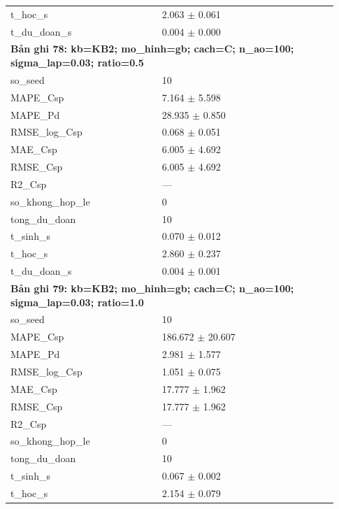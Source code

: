 \begin{longtable}{p{0.43\linewidth}p{0.50\linewidth}}
t\_\allowbreak hoc\_\allowbreak s & 2.063 $\pm$ 0.061 \\
t\_\allowbreak du\_\allowbreak doan\_\allowbreak s & 0.004 $\pm$ 0.000 \\
\midrule
\multicolumn{2}{p{0.95\linewidth}}{\textbf{Bản ghi 78: kb=KB2; mo\_hinh=gb; cach=C; n\_ao=100; sigma\_lap=0.03; ratio=0.5}} \\
so\_\allowbreak seed & 10 \\
MAPE\_\allowbreak Csp & 7.164 $\pm$ 5.598 \\
MAPE\_\allowbreak Pd & 28.935 $\pm$ 0.850 \\
RMSE\_\allowbreak log\_\allowbreak Csp & 0.068 $\pm$ 0.051 \\
MAE\_\allowbreak Csp & 6.005 $\pm$ 4.692 \\
RMSE\_\allowbreak Csp & 6.005 $\pm$ 4.692 \\
R2\_\allowbreak Csp & — \\
so\_\allowbreak khong\_\allowbreak hop\_\allowbreak le & 0 \\
tong\_\allowbreak du\_\allowbreak doan & 10 \\
t\_\allowbreak sinh\_\allowbreak s & 0.070 $\pm$ 0.012 \\
t\_\allowbreak hoc\_\allowbreak s & 2.860 $\pm$ 0.237 \\
t\_\allowbreak du\_\allowbreak doan\_\allowbreak s & 0.004 $\pm$ 0.001 \\
\midrule
\multicolumn{2}{p{0.95\linewidth}}{\textbf{Bản ghi 79: kb=KB2; mo\_hinh=gb; cach=C; n\_ao=100; sigma\_lap=0.03; ratio=1.0}} \\
so\_\allowbreak seed & 10 \\
MAPE\_\allowbreak Csp & 186.672 $\pm$ 20.607 \\
MAPE\_\allowbreak Pd & 2.981 $\pm$ 1.577 \\
RMSE\_\allowbreak log\_\allowbreak Csp & 1.051 $\pm$ 0.075 \\
MAE\_\allowbreak Csp & 17.777 $\pm$ 1.962 \\
RMSE\_\allowbreak Csp & 17.777 $\pm$ 1.962 \\
R2\_\allowbreak Csp & — \\
so\_\allowbreak khong\_\allowbreak hop\_\allowbreak le & 0 \\
tong\_\allowbreak du\_\allowbreak doan & 10 \\
t\_\allowbreak sinh\_\allowbreak s & 0.067 $\pm$ 0.002 \\
t\_\allowbreak hoc\_\allowbreak s & 2.154 $\pm$ 0.079 \\

\end{longtable}
